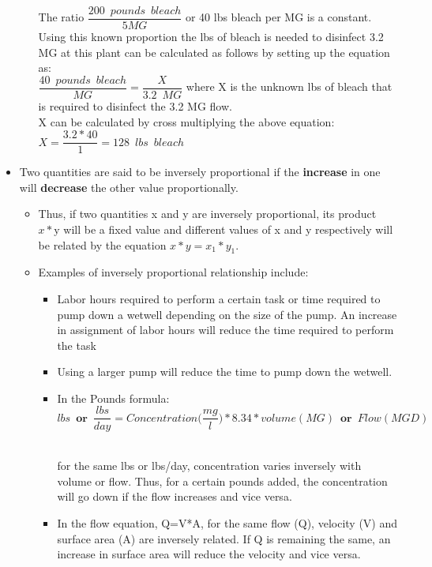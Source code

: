 \begin{itemize}
\begin{itemize}
The ratio $\dfrac{200 \enspace pounds \enspace bleach}{5 MG}$ or 40 lbs bleach per MG is a constant.  
Using this known proportion the lbs of bleach is needed to disinfect 3.2 MG at this plant can be calculated as follows by setting up the equation as:\\
\vspace{0.2cm}
$\dfrac{40 \enspace pounds \enspace bleach}{MG}=\dfrac{X}{3.2 \enspace MG}$ where X is the unknown lbs of bleach that is required to disinfect the 3.2 MG flow.\\
\vspace{0.2cm}
X can be calculated by cross multiplying the above equation: $X=\dfrac{3.2*40}{1}=128 \enspace lbs \enspace bleach$
\end{itemize}
\item Two quantities are said to be inversely proportional if the \textbf{increase} in one will \textbf{decrease} the other value proportionally.  
\begin{itemize}
\item Thus, if two quantities x and y are inversely proportional, its product $x * \text{y}$ will be a fixed value and different values of x and y respectively will be related by the equation $x *y = x_1 * y_1$.
\item Examples of inversely proportional relationship include:\\
\vspace{0.2cm}
\begin{itemize}
\item Labor hours required to perform a certain task or time required to pump down a wetwell depending on the size of the pump.  An increase in assignment of labor hours will reduce the time required to perform the task 
\item Using a larger pump will reduce the time to pump down the wetwell.  
\item In the Pounds formula:\\
\vspace{0.2cm}
$$lbs \enspace \textbf{or} \enspace \dfrac{lbs}{day}=Concentration\Big(\dfrac{mg}{l}\Big)*8.34*volume(MG) \enspace \textbf{or} \enspace Flow (MGD)$$\\
 
\vspace{0.2cm}

for the same lbs or lbs/day, concentration varies inversely with volume or flow.  Thus, for a certain pounds added, the concentration will go down if the flow increases and vice versa.
\item In the flow equation, Q=V*A, for the same flow (Q), velocity (V) and surface area (A) are inversely related.  If Q is remaining the same, an increase in surface area will reduce the velocity and vice versa.\\


\end{itemize}
\end{itemize}
\end{itemize}
